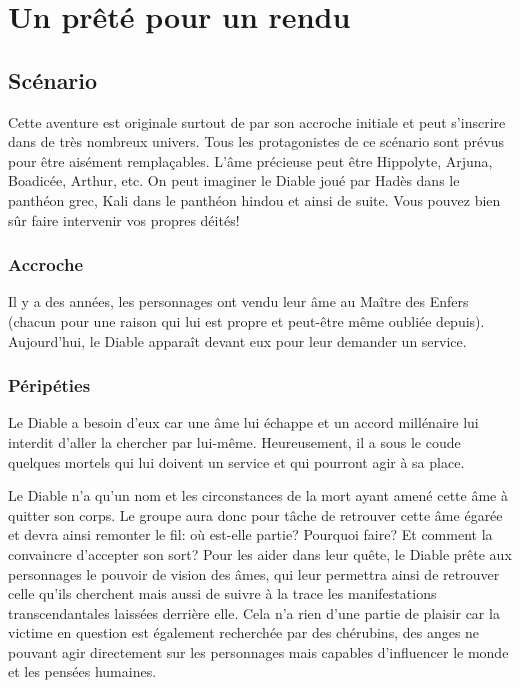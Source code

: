 \chapter{Un prêté pour un rendu}

\section{Scénario}

Cette aventure est originale surtout de par son accroche initiale et peut s'inscrire dans de très nombreux univers.
Tous les protagonistes de ce scénario sont prévus pour être aisément remplaçables. L'âme précieuse peut être Hippolyte, Arjuna, Boadicée, Arthur, etc. On peut imaginer le Diable joué par Hadès dans le panthéon grec, Kali dans le panthéon hindou et ainsi de suite. Vous pouvez bien sûr faire intervenir vos propres déités!

\subsection{Accroche}

Il y a des années, les personnages ont vendu leur âme au Maître des Enfers (chacun pour une raison qui lui est propre et peut-être même oubliée depuis).
Aujourd'hui, le Diable apparaît devant eux pour leur demander un service.

\subsection{Péripéties}

Le Diable a besoin d'eux car une âme lui échappe et un accord millénaire lui interdit d'aller la chercher par lui-même.
Heureusement, il a sous le coude quelques mortels qui lui doivent un service et qui pourront agir à sa place.

Le Diable n'a qu'un nom et les circonstances de la mort ayant amené cette âme à quitter son corps.
Le groupe aura donc pour tâche de retrouver cette âme égarée et devra ainsi remonter le fil: où est-elle partie?
Pourquoi faire?
Et comment la convaincre d'accepter son sort?
Pour les aider dans leur quête, le Diable prête aux personnages le pouvoir de vision des âmes, qui leur permettra ainsi de retrouver celle qu'ils cherchent mais aussi de suivre à la trace les manifestations \og transcendantales \fg laissées derrière elle.
Cela n'a rien d'une partie de plaisir car la victime en question est également recherchée par des chérubins, des anges ne pouvant agir directement sur les personnages mais capables d'influencer le monde et les pensées humaines.

